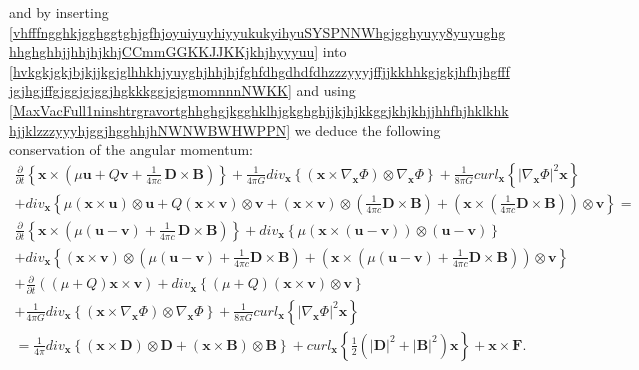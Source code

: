 \documentclass{article}
\theoremstyle{definition}
\theoremstyle{remark}
\renewcommand{\vec}[1]{\mathbf{#1}}
\newcommand{\er}{\eqref}
\newcommand{\er}{\eqref}
\begin{document}
and by inserting
\er{vhfffngghkjgghggtghjgfhjoyuiyuyhiyyukukyihyuSYSPNNWhgjgghyuyy8yuyughghhghghhjjhhjhjkhjCCmmGGKKJJKKjkhjhyyyuu}
into
\er{hvkgkjgkjbjkjjkgjglhhkhjyuyghjhhjhjfghfdhgdhdfdhzzzyyyjffjjkkhhkgjgkjhfhjhgfffjgjhgjffgjggjgjggjhgkkkggjgjgmomnnnNWKK}
and using
\er{MaxVacFull1ninshtrgravortghhghgjkgghklhjgkghghjjkjhjkkggjkhjkhjjhhfhjhklkhkhjjklzzzyyyhjggjhgghhjhNWNWBWHWPPN}
we deduce the following conservation of the angular momentum:
\begin{multline}\label{hvkgkjgkjbjkjjkgjglhhkhjyuyghjhhjhjfghfdhgdhdfdhzzzyyyjffjjkkhhkgjgkjhfhjhgfffjgjhgjffgjggjgjggjhgkkkggjgjgmomnnnNWKKhgjggh}
\frac{\partial}{\partial t}\left\{\vec x\times\left(\mu\vec u+Q\vec
v+\frac{1}{4\pi c}\,\vec D\times \vec B\right)\right\}+\frac{1}{4\pi
G}div_{\vec x}\left\{\left(\vec x\times\nabla_{\vec
x}\Phi\right)\otimes \nabla_{\vec x}\Phi\right\}+\frac{1}{8\pi
G}curl_{\vec x}\left\{\left|\nabla_{\vec x}\Phi\right|^2\vec
x\right\}\\+div_{\vec x}\left\{\mu\left(\vec x\times\vec
u\right)\otimes\vec u+Q\left(\vec x\times\vec v\right)\otimes\vec
v+\left(\vec x \times\vec v\right)\otimes\left(\frac{1}{4\pi c}\vec
D\times \vec B\right)+\left(\vec x\times\left(\frac{1}{4\pi c}\vec
D\times \vec
B\right)\right)\otimes \vec v\right\}=\\
\frac{\partial}{\partial t}\left\{\vec x\times\left(\mu(\vec u-\vec
v)+\frac{1}{4\pi c}\,\vec D\times \vec B\right)\right\}+div_\vec
x\left\{\mu\left(\vec x\times(\vec u-\vec v)\right)\otimes(\vec
u-\vec v)\right\}\\+div_{\vec x}\left\{\left(\vec x \times\vec
v\right)\otimes\left(\mu(\vec u-\vec v)+\frac{1}{4\pi c}\vec D\times
\vec B\right)+\left(\vec x\times\left(\mu(\vec u-\vec
v)+\frac{1}{4\pi c}\vec D\times \vec B\right)\right)\otimes \vec
v\right\}\\+\frac{\partial}{\partial t}\left(\left(\mu+Q\right)\vec
x\times\vec v\right)+div_{\vec x}\left\{\left(\mu+Q\right)\left(\vec
x\times\vec v\right)\otimes\vec v\right\}\\+\frac{1}{4\pi
G}div_{\vec x}\left\{\left(\vec x\times\nabla_{\vec
x}\Phi\right)\otimes \nabla_{\vec x}\Phi\right\}+\frac{1}{8\pi
G}curl_{\vec
x}\left\{\left|\nabla_{\vec x}\Phi\right|^2\vec x\right\}\\
=\frac{1}{4\pi}div_\vec x\left\{(\vec x\times \vec D)\otimes \vec
D+(\vec x\times\vec B)\otimes \vec B\right\}+curl_{\vec
x}\left\{\frac{1}{2}\left(|\vec D|^2+|\vec B|^2\right)\vec
x\right\}+\vec x\times\vec F.
\end{multline}
\end{document}
